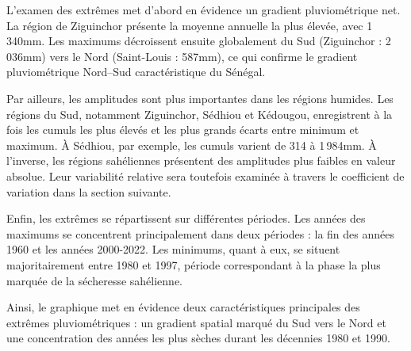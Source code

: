 \documentclass[12pt,a4paper]{report}
\begin{document}
L’examen des extrêmes met d’abord en évidence un gradient pluviométrique net. La région de Ziguinchor présente la moyenne annuelle la plus élevée, avec 1\,340mm. Les maximums décroissent ensuite globalement du Sud (Ziguinchor : 2\,036mm) vers le Nord (Saint-Louis : 587mm), ce qui confirme le gradient pluviométrique Nord--Sud caractéristique du Sénégal.

Par ailleurs, les amplitudes sont plus importantes dans les régions humides. Les régions du Sud, notamment Ziguinchor, Sédhiou et Kédougou, enregistrent à la fois les cumuls les plus élevés et les plus grands écarts entre minimum et maximum. À Sédhiou, par exemple, les cumuls varient de 314 à 1\,984mm. À l’inverse, les régions sahéliennes présentent des amplitudes plus faibles en valeur absolue. Leur variabilité relative sera toutefois examinée à travers le coefficient de variation dans la section suivante.

Enfin, les extrêmes se répartissent sur différentes périodes. Les années des maximums se concentrent principalement dans deux périodes : la fin des années 1960 et les années 2000-2022. Les minimums, quant à eux, se situent majoritairement entre 1980 et 1997, période correspondant à la phase la plus marquée de la sécheresse sahélienne.

Ainsi, le graphique met en évidence deux caractéristiques principales des extrêmes pluviométriques : un gradient spatial marqué du Sud vers le Nord et une concentration des années les plus sèches durant les décennies 1980 et 1990.
\end{document}
